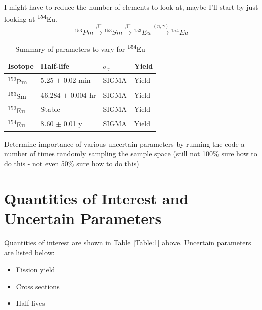 \documentclass[11pt,notitlepage]{article}
\newcommand{\tss}{\textsuperscript}
\begin{document}
\begin{todolist}
  I might have to reduce the number of elements to look at,
  maybe I'll start by
  just looking at \tss{154}Eu.
  \begin{equation*}
    ^{153}Pm\xrightarrow{\beta^-} {^{153}Sm}\xrightarrow{\beta^-}
    {^{153}Eu}
    \xrightarrow{(n,\gamma)} {^{154}Eu}
  \end{equation*}

  \begin{table}[H]
  \begin{center}
    \caption{Summary of parameters to vary for \tss{154}Eu}
    \label{Table:4}
    \begin{tabular}{l|l|l|l}
      \toprule
      Isotope & Half-life & $\sigma_\gamma$ & Yield\\
      \hline
      \tss{153}Pm & 5.25 $\pm$ 0.02 min & SIGMA & Yield \\
      \tss{153}Sm & 46.284 $\pm$ 0.004 hr & SIGMA & Yield\\
      \tss{153}Eu & Stable & SIGMA & Yield \\
      \tss{154}Eu & 8.60 $\pm$ 0.01 y  & SIGMA & Yield \\
      \bottomrule
    \end{tabular}
  \end{center}
  \end{table}

  
\item{Determine importance of various uncertain parameters
  by running the code a number of times randomly sampling
  the sample space (still not 100\% sure how to do this -
  not even 50\% sure how to do this)}
\end{todolist}



\section{Quantities of Interest and Uncertain Parameters}

Quantities of interest are shown in Table \ref{Table:1} above.
Uncertain parameters are listed below:

\begin{itemize}
\item{Fission yield}
\item{Cross sections}
\item{Half-lives}
\end{itemize}
\end{document}
